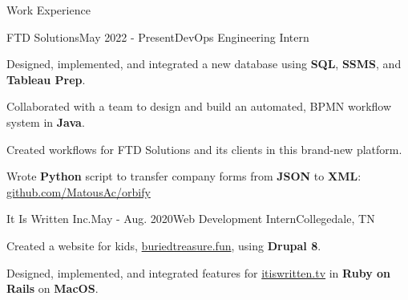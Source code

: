 \begin{rSection}{Work Experience}
  \begin{job}{FTD Solutions}{May 2022 - Present}{DevOps Engineering Intern}{}
    \item Designed, implemented, and integrated a new database using {\bf SQL}, {\bf SSMS}, and {\bf Tableau Prep}.
    \item Collaborated with a team to design and build an automated, BPMN workflow system in {\bf Java}.
    \item Created workflows for FTD Solutions and its clients in this brand-new platform.
    \item Wrote {\bf Python} script to transfer company forms from {\bf JSON} to {\bf XML}: \href{https://github.com/MatousAc/orbify}{github.com/MatousAc/orbify}
  \end{job}



  \begin{job}{It Is Written Inc.}{May - Aug. 2020}{Web Development Intern}{Collegedale, TN}
    \item Created a website for kids, \href{https://buriedtreasure.fun/}{buriedtreasure.fun}, using {\bf Drupal 8}.
    \item Designed, implemented, and integrated features for \href{https://itiswritten.tv}{itiswritten.tv} in {\bf Ruby on Rails} on {\bf MacOS}.
  \end{job}
\end{rSection}
